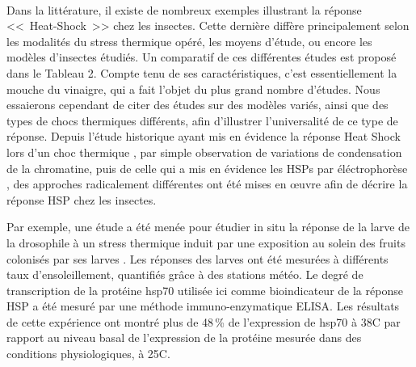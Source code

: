 		\paragraph*{}


		Dans la littérature, il existe de nombreux exemples illustrant la réponse <<~Heat-Shock~>> chez les insectes. Cette dernière diffère principalement selon les modalités du stress thermique opéré, les moyens d'étude,  ou encore les modèles d'insectes étudiés. Un comparatif de ces différentes études est proposé dans le Tableau 2.
		Compte tenu de ses caractéristiques, c'est essentiellement la mouche du vinaigre,  qui a fait l'objet du plus grand nombre d'études.
		Nous essaierons cependant de citer des études sur des modèles variés, ainsi que des types de chocs thermiques différents, afin d'illustrer l'universalité de ce type de réponse.
		Depuis l'étude historique ayant mis en évidence la réponse Heat Shock lors d'un choc thermique \cite{ritossa1996}, par simple observation de variations de condensation de la chromatine, puis de celle qui a mis en évidence les HSPs par éléctrophorèse \cite{tissieres1974}, 
		des approches radicalement différentes ont été mises en \oe{}uvre afin de décrire la réponse HSP chez les insectes.

		Par exemple, une étude a été menée pour étudier in situ la réponse de la larve de la drosophile à un stress thermique induit par une exposition au solein des fruits colonisés par ses larves \cite{feder1997}.
		Les réponses des larves ont été mesurées à différents taux d'ensoleillement, quantifiés grâce à des stations météo.
		Le degré de transcription de la protéine hsp70 utilisée ici comme bioindicateur de la réponse HSP a été mesuré par une méthode immuno-enzymatique ELISA.
		Les résultats de cette expérience ont montré plus de 48\,\% de l'expression de hsp70 à 38\textdegree{}C par rapport au niveau basal de l'expression de la protéine mesurée dans des conditions physiologiques, à 25\textdegree{}C. 

